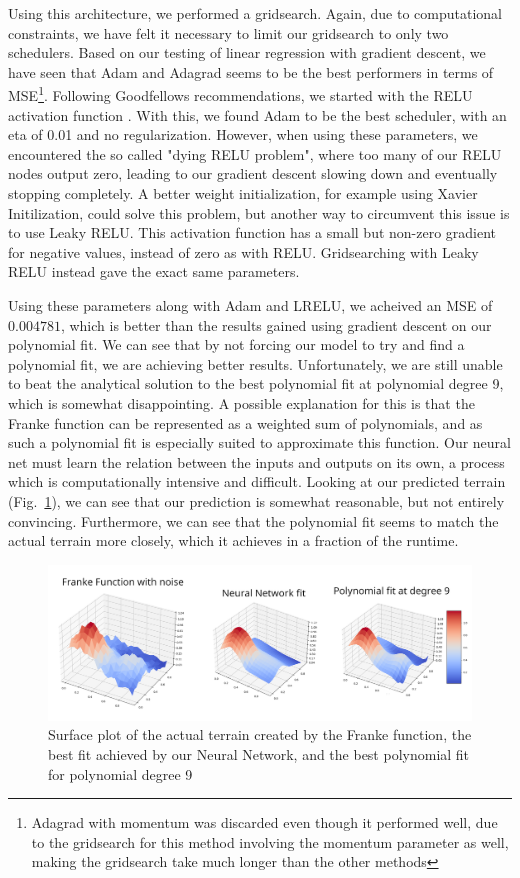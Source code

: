 \documentclass[onecolumn,10pt,cleanfoot]{asme2ej}
\begin{document}
Using this architecture, we performed a gridsearch. Again, due to computational constraints, we have felt it necessary to limit our gridsearch to only two schedulers. Based on our testing of linear regression with gradient descent, we have seen that Adam and Adagrad seems to be the best performers in terms of MSE\footnote{Adagrad with momentum was discarded even though it performed well, due to the gridsearch for this method involving the momentum parameter as well, making the gridsearch take much longer than the other methods}. Following Goodfellows recommendations, we started with the RELU activation function \cite[188]{gbc}. With this, we found Adam to be the best scheduler, with an eta of 0.01 and no regularization. However, when using these parameters, we encountered the so called "dying RELU problem", where too many of our RELU nodes output zero, leading to our gradient descent slowing down and eventually stopping completely. A better weight initialization, for example using Xavier Initilization, could solve this problem, but another way to circumvent this issue is to use Leaky RELU. This activation function has a small but non-zero gradient for negative values, instead of zero as with RELU. Gridsearching with Leaky RELU instead gave the exact same parameters.

Using these parameters along with Adam and LRELU, we acheived an MSE of $0.004781$, which is better than the results gained using gradient descent on our polynomial fit. We can see that by not forcing our model to try and find a polynomial fit, we are achieving better results. Unfortunately, we are still unable to beat the analytical solution to the best polynomial fit at polynomial degree 9, which is somewhat disappointing. A possible explanation for this is that the Franke function can be represented as a weighted sum of polynomials, and as such a polynomial fit is especially suited to approximate this function. Our neural net must learn the relation between the inputs and outputs on its own, a process which is computationally intensive and difficult. Looking at our predicted terrain (Fig.~\ref{predterrain}), we can see that our prediction is somewhat reasonable, but not entirely convincing. Furthermore, we can see that the polynomial fit seems to match the actual terrain more closely, which it achieves in a fraction of the runtime.

\begin{figure}[H]
\centerline{\includegraphics[width=7in]{figure/Franke_fit_66x3_lam0.png}}
\caption{Surface plot of the actual terrain created by the Franke function, the best fit achieved by our Neural Network, and the best polynomial fit for polynomial degree 9}
\label{predterrain}
\end{figure}
\end{document}
